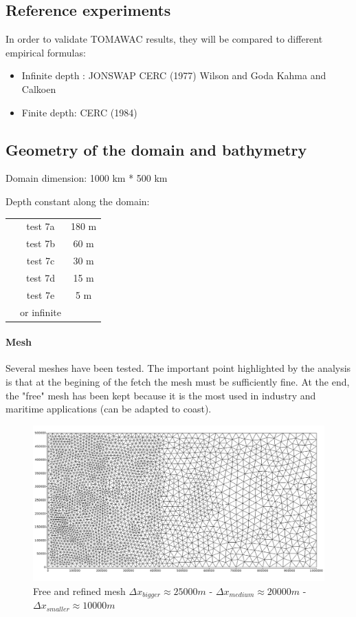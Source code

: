 \subsection{Reference experiments}
In order to validate TOMAWAC results, they will be compared to different empirical formulas:
\begin{itemize}
\item Infinite depth :
\subitem JONSWAP \cite{Hasselmann1973}
\subitem CERC (1977) \cite{CERC77}
\subitem Wilson and Goda \cite{Wilson1965}
\subitem Kahma and Calkoen \cite{Kahma1992}
\item Finite depth:
\subitem CERC (1984)\cite{CERC84}
\end{itemize}
\subsection{Geometry of the domain and bathymetry}
Domain  dimension: 1000 km * 500 km

Depth constant along the domain:
\begin{tabular}{ccc}
 & test 7a & 180 m\\
 & test 7b & 60 m\\
& test 7c & 30 m\\
& test 7d & 15 m\\
& test 7e & 5 m\\
 & or infinite\\
\end{tabular}
\paragraph{Mesh}
Several meshes have been tested. The important point highlighted by the analysis is that at the begining of the fetch the mesh must be sufficiently fine. At the end, the "free" mesh has been kept because it is the most used in industry and maritime applications (can be adapted to coast).
\begin{figure}[H]
\centering
\includegraphics[scale = 0.35]{freemesh.png}
\caption{Free and refined mesh $\Delta x_{bigger} \approx 25 000 m$ - $\Delta x_{medium} \approx 20 000 m$ - $\Delta x_{smaller} \approx 10 000 m$}
\label{meshfet}
\end{figure}

